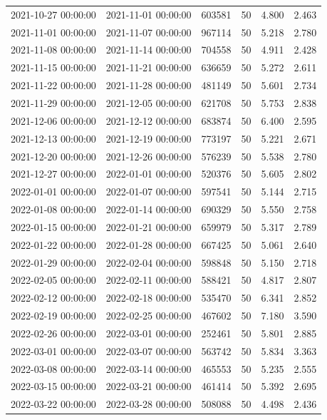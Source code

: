 \begin{tabular}{llrrrr}
2021-10-27 00:00:00 & 2021-11-01 00:00:00 & 603581 & 50 & 4.800 & 2.463 \\
2021-11-01 00:00:00 & 2021-11-07 00:00:00 & 967114 & 50 & 5.218 & 2.780 \\
2021-11-08 00:00:00 & 2021-11-14 00:00:00 & 704558 & 50 & 4.911 & 2.428 \\
2021-11-15 00:00:00 & 2021-11-21 00:00:00 & 636659 & 50 & 5.272 & 2.611 \\
2021-11-22 00:00:00 & 2021-11-28 00:00:00 & 481149 & 50 & 5.601 & 2.734 \\
2021-11-29 00:00:00 & 2021-12-05 00:00:00 & 621708 & 50 & 5.753 & 2.838 \\
2021-12-06 00:00:00 & 2021-12-12 00:00:00 & 683874 & 50 & 6.400 & 2.595 \\
2021-12-13 00:00:00 & 2021-12-19 00:00:00 & 773197 & 50 & 5.221 & 2.671 \\
2021-12-20 00:00:00 & 2021-12-26 00:00:00 & 576239 & 50 & 5.538 & 2.780 \\
2021-12-27 00:00:00 & 2022-01-01 00:00:00 & 520376 & 50 & 5.605 & 2.802 \\
2022-01-01 00:00:00 & 2022-01-07 00:00:00 & 597541 & 50 & 5.144 & 2.715 \\
2022-01-08 00:00:00 & 2022-01-14 00:00:00 & 690329 & 50 & 5.550 & 2.758 \\
2022-01-15 00:00:00 & 2022-01-21 00:00:00 & 659979 & 50 & 5.317 & 2.789 \\
2022-01-22 00:00:00 & 2022-01-28 00:00:00 & 667425 & 50 & 5.061 & 2.640 \\
2022-01-29 00:00:00 & 2022-02-04 00:00:00 & 598848 & 50 & 5.150 & 2.718 \\
2022-02-05 00:00:00 & 2022-02-11 00:00:00 & 588421 & 50 & 4.817 & 2.807 \\
2022-02-12 00:00:00 & 2022-02-18 00:00:00 & 535470 & 50 & 6.341 & 2.852 \\
2022-02-19 00:00:00 & 2022-02-25 00:00:00 & 467602 & 50 & 7.180 & 3.590 \\
2022-02-26 00:00:00 & 2022-03-01 00:00:00 & 252461 & 50 & 5.801 & 2.885 \\
2022-03-01 00:00:00 & 2022-03-07 00:00:00 & 563742 & 50 & 5.834 & 3.363 \\
2022-03-08 00:00:00 & 2022-03-14 00:00:00 & 465553 & 50 & 5.235 & 2.555 \\
2022-03-15 00:00:00 & 2022-03-21 00:00:00 & 461414 & 50 & 5.392 & 2.695 \\
2022-03-22 00:00:00 & 2022-03-28 00:00:00 & 508088 & 50 & 4.498 & 2.436 \\

\end{tabular}
